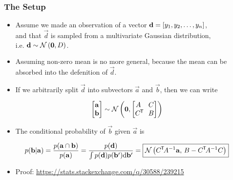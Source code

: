 \begin{frame} \frametitle{The Setup}
\begin{itemize}
  \item Assume we made an observation of a vector
    $\vec{d} = [y_1,y_2,\mathellipsis,y_n]$,\\
    and that $\vec{d}$ is sampled from a multivariate Gaussian
    distribution,\\i.e. $\vec{d}\sim\N{\vec{0},D}$.
  \vspace{1mm}
  \item Assuming non-zero mean is no more general, because the mean can be
    absorbed into the defenition of $\vec{d}$.
  \vspace{1mm}
  \item If we arbitrarily split $\vec{d}$ into subvectors
    $\vec{a}$ and $\vec{b}$, then we can write
\end{itemize}
\begin{equation}\label{eq:n1}
  \begin{bmatrix} \vec{a} \\ \vec{b} \end{bmatrix} \sim
    \N{\vec{0},\begin{bmatrix} A & C \\ C\T\!\! & B \end{bmatrix}}
\end{equation}
\begin{itemize}
  \item The conditional probability of $\vec{b}$ given $\vec{a}$ is
\end{itemize}
\vspace{1mm}
\begin{equation}
  p(\vec{b}|\vec{a})
  = \frac{p(\vec{a}\cap\vec{b})}{p(\vec{a})}
  = \frac{p(\vec{d})}{\int p(\vec{d})p(\vec{b}') \mathrm{d}\vec{b}'}
  = \boxed{ \N{C\T\!A^{-1}\vec{a},\,B-C\T\!A^{-1}C} }
\end{equation}
\vspace{-5mm}
\begin{itemize}
  \item Proof: {\small\url{https://stats.stackexchange.com/q/30588/239215}}
\end{itemize}
\end{frame}

